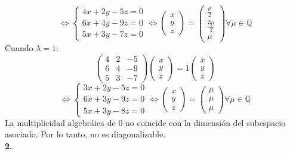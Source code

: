 \documentclass{article}
\begin{document}
$$
\Leftrightarrow \left\{ \begin{array}{c}
     4x+2y-5z =0  \\
     6x+4y-9z=0  \\
     5x+3y-7z =0
\end{array} \right.
\Leftrightarrow \left( \begin{array}{c}
      x \\
      y \\
      z
\end{array} \right) =
\left( \begin{array}{c}
      \frac{\mu}{2} \\
      \frac{3\mu}{2} \\
      \mu
\end{array} \right) \forall \mu \in \mathbb{Q}
$$
Cuando $\lambda=1$:
$$
\left( \begin{array}{ccc}
    4 & 2 & -5\\
    6 & 4 & -9\\
    5 & 3 & -7
\end{array} \right)
\left( \begin{array}{c}
      x \\
      y \\
      z
\end{array} \right) = 1
\left( \begin{array}{c}
      x \\
      y \\
      z
\end{array} \right)
$$
$$
\Leftrightarrow \left\{ \begin{array}{c}
     3x+2y-5z =0  \\
     6x+3y-9z=0  \\
     5x+3y-8z =0
\end{array} \right.
\Leftrightarrow \left( \begin{array}{c}
      x \\
      y \\
      z
\end{array} \right) =
\left( \begin{array}{c}
      \mu \\
      \mu \\
      \mu
\end{array} \right) \forall \mu \in \mathbb{Q}
$$
La multiplicidad algebráica de $0$ no coincide con la dimensión del subespacio asociado. Por lo tanto, no es diagonalizable.
%
%
%
%
\\
\noindent \textbf{2.}\\
\end{document}
